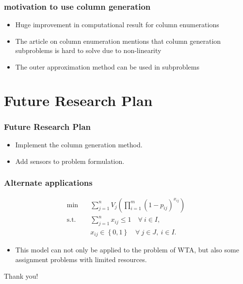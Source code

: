 \documentclass[CJK,10pt]{beamer}
\begin{document}
\begin{frame}
    \frametitle{motivation to use column generation}
    \begin{itemize}
        \item Huge improvement in computational result for column enumerations
        \item The article on column enumeration mentions that column generation subproblems is hard to solve due to non-linearity
        \item The outer approximation method can be used in subproblems
    \end{itemize}
\end{frame}

\section{Future Research Plan}
\begin{frame}
    \frametitle{Future Research Plan}
    \begin{itemize}
        \item Implement the column generation method.
        \item Add sensors to problem formulation.
    \end{itemize}
\end{frame}

\begin{frame}
    \frametitle{Alternate applications}
    \begin{align}
        \min\quad & \sum_{j=1}^n V_j \left( \prod_{i=1}^m (1 -  p_{ij})^{x_{ij}} \right) \\ 
        \mathrm{s. t.}\quad &\sum_{j=1}^n x_{ij} \leq 1\quad \forall ~i \in I,\\
        & x_{ij} \in \left\{ 0,1 \right\} \quad \forall~ j\in J , ~ i \in I.
    \end{align}
    \begin{itemize}
        \item This model can not only be applied to the problem of WTA, but also some assignment problems with limited resources.
    \end{itemize}
\end{frame}

\begin{frame}
\textcolor{myNewColorA}{\Huge{\centerline{Thank you!}}}
\end{frame}
\end{document}
